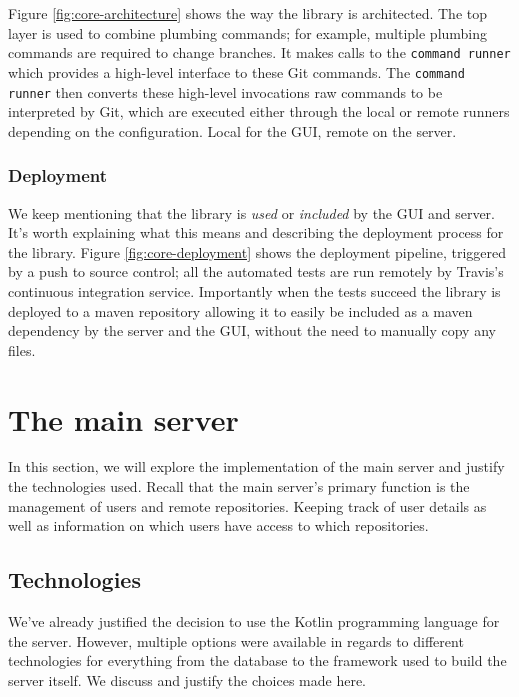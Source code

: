Figure \ref{fig:core-architecture} shows the way the library is architected. The top layer is used to combine plumbing commands; for example, multiple plumbing commands are required to change branches. It makes calls to the \texttt{command runner} which provides a high-level interface to these Git commands. The  \texttt{command runner} then converts these high-level invocations raw commands to be interpreted by Git, which are executed either through the local or remote runners depending on the configuration. Local for the GUI, remote on the server.



\subsubsection{Deployment}

We keep mentioning that the library is \emph{used} or \emph{included} by the GUI and server. It's worth explaining what this means and describing the deployment process for the library. Figure \ref{fig:core-deployment} shows the deployment pipeline, triggered by a push to source control; all the automated tests are run remotely by Travis's continuous integration service. Importantly when the tests succeed the library is deployed to a maven repository allowing it to easily be included as a maven dependency by the server and the GUI, without the need to manually copy any files.


\section{The main server}
In this section, we will explore the implementation of the main server and justify the technologies used. Recall that the main server's primary function is the management of users and remote repositories. Keeping track of user details as well as information on which users have access to which repositories. 

\subsection{Technologies}

We've already justified the decision to use the Kotlin programming language for the server. However, multiple options were available in regards to different technologies for everything from the database to the framework used to build the server itself. We discuss and justify the choices made here.

